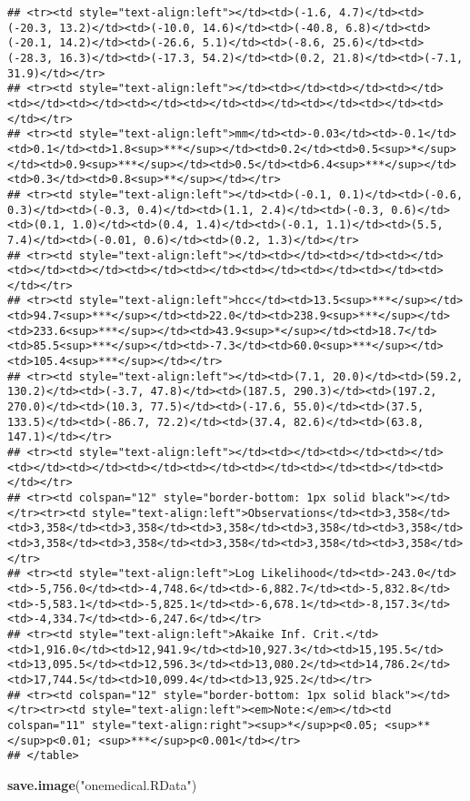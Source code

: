 \documentclass[]{article}
\newenvironment{Shaded}{\begin{snugshade}}{\end{snugshade}}
\newcommand{\KeywordTok}[1]{\textcolor[rgb]{0.13,0.29,0.53}{\textbf{#1}}}
\newcommand{\StringTok}[1]{\textcolor[rgb]{0.31,0.60,0.02}{#1}}
\newcommand{\NormalTok}[1]{#1}
\begin{document}
\begin{verbatim}
## <tr><td style="text-align:left"></td><td>(-1.6, 4.7)</td><td>(-20.3, 13.2)</td><td>(-10.0, 14.6)</td><td>(-40.8, 6.8)</td><td>(-20.1, 14.2)</td><td>(-26.6, 5.1)</td><td>(-8.6, 25.6)</td><td>(-28.3, 16.3)</td><td>(-17.3, 54.2)</td><td>(0.2, 21.8)</td><td>(-7.1, 31.9)</td></tr>
## <tr><td style="text-align:left"></td><td></td><td></td><td></td><td></td><td></td><td></td><td></td><td></td><td></td><td></td><td></td></tr>
## <tr><td style="text-align:left">mm</td><td>-0.03</td><td>-0.1</td><td>0.1</td><td>1.8<sup>***</sup></td><td>0.2</td><td>0.5<sup>*</sup></td><td>0.9<sup>***</sup></td><td>0.5</td><td>6.4<sup>***</sup></td><td>0.3</td><td>0.8<sup>**</sup></td></tr>
## <tr><td style="text-align:left"></td><td>(-0.1, 0.1)</td><td>(-0.6, 0.3)</td><td>(-0.3, 0.4)</td><td>(1.1, 2.4)</td><td>(-0.3, 0.6)</td><td>(0.1, 1.0)</td><td>(0.4, 1.4)</td><td>(-0.1, 1.1)</td><td>(5.5, 7.4)</td><td>(-0.01, 0.6)</td><td>(0.2, 1.3)</td></tr>
## <tr><td style="text-align:left"></td><td></td><td></td><td></td><td></td><td></td><td></td><td></td><td></td><td></td><td></td><td></td></tr>
## <tr><td style="text-align:left">hcc</td><td>13.5<sup>***</sup></td><td>94.7<sup>***</sup></td><td>22.0</td><td>238.9<sup>***</sup></td><td>233.6<sup>***</sup></td><td>43.9<sup>*</sup></td><td>18.7</td><td>85.5<sup>***</sup></td><td>-7.3</td><td>60.0<sup>***</sup></td><td>105.4<sup>***</sup></td></tr>
## <tr><td style="text-align:left"></td><td>(7.1, 20.0)</td><td>(59.2, 130.2)</td><td>(-3.7, 47.8)</td><td>(187.5, 290.3)</td><td>(197.2, 270.0)</td><td>(10.3, 77.5)</td><td>(-17.6, 55.0)</td><td>(37.5, 133.5)</td><td>(-86.7, 72.2)</td><td>(37.4, 82.6)</td><td>(63.8, 147.1)</td></tr>
## <tr><td style="text-align:left"></td><td></td><td></td><td></td><td></td><td></td><td></td><td></td><td></td><td></td><td></td><td></td></tr>
## <tr><td colspan="12" style="border-bottom: 1px solid black"></td></tr><tr><td style="text-align:left">Observations</td><td>3,358</td><td>3,358</td><td>3,358</td><td>3,358</td><td>3,358</td><td>3,358</td><td>3,358</td><td>3,358</td><td>3,358</td><td>3,358</td><td>3,358</td></tr>
## <tr><td style="text-align:left">Log Likelihood</td><td>-243.0</td><td>-5,756.0</td><td>-4,748.6</td><td>-6,882.7</td><td>-5,832.8</td><td>-5,583.1</td><td>-5,825.1</td><td>-6,678.1</td><td>-8,157.3</td><td>-4,334.7</td><td>-6,247.6</td></tr>
## <tr><td style="text-align:left">Akaike Inf. Crit.</td><td>1,916.0</td><td>12,941.9</td><td>10,927.3</td><td>15,195.5</td><td>13,095.5</td><td>12,596.3</td><td>13,080.2</td><td>14,786.2</td><td>17,744.5</td><td>10,099.4</td><td>13,925.2</td></tr>
## <tr><td colspan="12" style="border-bottom: 1px solid black"></td></tr><tr><td style="text-align:left"><em>Note:</em></td><td colspan="11" style="text-align:right"><sup>*</sup>p<0.05; <sup>**</sup>p<0.01; <sup>***</sup>p<0.001</td></tr>
## </table>
\end{verbatim}

\begin{Shaded}
\begin{Highlighting}[]
\KeywordTok{save.image}\NormalTok{(}\StringTok{"onemedical.RData"}\NormalTok{)}
\end{Highlighting}
\end{Shaded}
\end{document}
